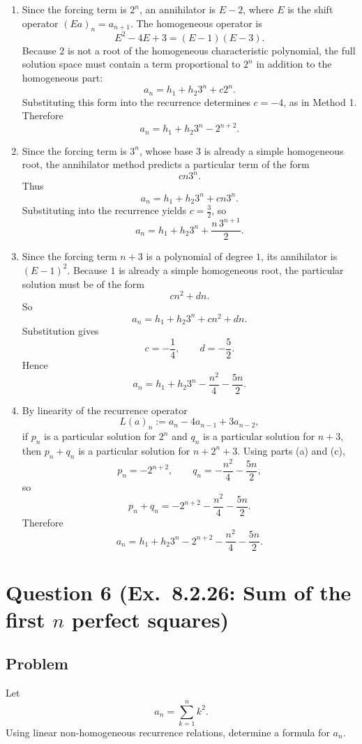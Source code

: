 \documentclass[12pt]{article}
\begin{document}
\begin{enumerate}[label=(\alph*)]
\item Since the forcing term is \(2^n\), an annihilator is \(E-2\), where \(E\) is the shift operator \((Ea)_n=a_{n+1}\). The homogeneous operator is
\[
E^2-4E+3=(E-1)(E-3).
\]
Because \(2\) is not a root of the homogeneous characteristic polynomial, the full solution space must contain a term proportional to \(2^n\) in addition to the homogeneous part:
\[
a_n=h_1+h_2 3^n+c2^n.
\]
Substituting this form into the recurrence determines \(c=-4\), as in Method 1. Therefore
\[
\boxed{a_n=h_1+h_2 3^n-2^{n+2}.}
\]

\item Since the forcing term is \(3^n\), whose base \(3\) is already a simple homogeneous root, the annihilator method predicts a particular term of the form
\[
cn3^n.
\]
Thus
\[
a_n=h_1+h_2 3^n+cn3^n.
\]
Substituting into the recurrence yields \(c=\frac32\), so
\[
\boxed{a_n=h_1+h_2 3^n+\frac{n\,3^{n+1}}{2}.}
\]

\item Since the forcing term \(n+3\) is a polynomial of degree \(1\), its annihilator is \((E-1)^2\). Because \(1\) is already a simple homogeneous root, the particular solution must be of the form
\[
cn^2+dn.
\]
So
\[
a_n=h_1+h_2 3^n+cn^2+dn.
\]
Substitution gives
\[
c=-\frac14,\qquad d=-\frac52.
\]
Hence
\[
\boxed{a_n=h_1+h_2 3^n-\frac{n^2}{4}-\frac{5n}{2}.}
\]

\item By linearity of the recurrence operator
\[
L(a)_n:=a_n-4a_{n-1}+3a_{n-2},
\]
if \(p_n\) is a particular solution for \(2^n\) and \(q_n\) is a particular solution for \(n+3\), then \(p_n+q_n\) is a particular solution for \(n+2^n+3\). Using parts (a) and (c),
\[
p_n=-2^{n+2},\qquad q_n=-\frac{n^2}{4}-\frac{5n}{2},
\]
so
\[
p_n+q_n=-2^{n+2}-\frac{n^2}{4}-\frac{5n}{2}.
\]
Therefore
\[
\boxed{a_n=h_1+h_2 3^n-2^{n+2}-\frac{n^2}{4}-\frac{5n}{2}.}
\]
\end{enumerate}

\newpage

\section{Question 6 (Ex.\ 8.2.26: Sum of the first \(n\) perfect squares)}

\subsection{Problem}
Let
\[
a_n=\sum_{k=1}^{n} k^2.
\]
Using linear non-homogeneous recurrence relations, determine a formula for \(a_n\).
\end{document}
